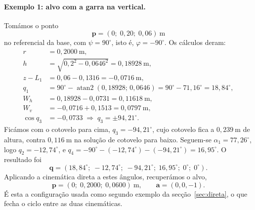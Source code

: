 \paragraph{Exemplo 1: alvo com a garra na vertical.} Tomámos o ponto
\begin{equation*}
\mathbf{p}=(0;\;0{,}20;\;0{,}06)~\mathrm{m}
\end{equation*}
no referencial da base, com $\psi=90^\circ$, isto é, $\varphi=-90^\circ$. Os cálculos deram:
\begin{align*}
r &= 0{,}2000~\mathrm{m},\\
h &= \sqrt{0{,}2^2-0{,}0646^2}=0{,}18928~\mathrm{m},\\
z-L_1 &= 0{,}06-0{,}1316=-0{,}0716~\mathrm{m},\\
q_1 &= 90^\circ-\operatorname{atan2}(0{,}18928;\,0{,}0646)=90^\circ-71{,}16^\circ=18{,}84^\circ,\\
W_h &= 0{,}18928-0{,}0731=0{,}11618~\mathrm{m},\\
W_v &= -0{,}0716+0{,}1513=0{,}0797~\mathrm{m},\\
\cos q_3 &= -0{,}0733 \;\Rightarrow\; q_3=\pm94{,}21^\circ.
\end{align*}
Ficámos com o cotovelo para cima, $q_3=-94{,}21^\circ$, cujo cotovelo fica a $0{,}239~\mathrm{m}$ de altura, contra $0{,}116~\mathrm{m}$ na solução de cotovelo para baixo. Seguem-se $\alpha_1=77{,}26^\circ$, logo $q_2=-12{,}74^\circ$, e $q_4=-90^\circ-(-12{,}74^\circ)-(-94{,}21^\circ)=16{,}95^\circ$. O resultado foi
\begin{equation*}
\mathbf{q}=(18{,}84^\circ;\;-12{,}74^\circ;\;-94{,}21^\circ;\;16{,}95^\circ;\;0^\circ;\;0^\circ).
\end{equation*}
Aplicando a cinemática direta a estes ângulos, recuperámos o alvo,
\begin{equation*}
\mathbf{p}=(0;\;0{,}2000;\;0{,}0600)~\mathrm{m}, \qquad \mathbf{a}=(0,0,-1).
\end{equation*}
É esta a configuração usada como segundo exemplo da secção~\ref{sec:direta}, o que fecha o ciclo entre as duas cinemáticas.

